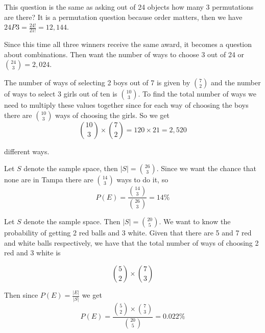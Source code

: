 \documentclass[11pt,largemargins]{homework}
\begin{document}
\maketitle

\question
\begin{alphaparts}
\questionpart
This question is the same as asking out of 24 objects how many 3 permutations are there? It is a permutation question because order matters, then we have $24P3 = \frac{24!}{21!} = 12,144$.

\questionpart
Since this time all three winners receive the same award, it becomes a question about combinations. Then want the number of ways to choose 3 out of 24 or ${24 \choose 3} = 2,024$.
\end{alphaparts}

\question
The number of ways of selecting 2 boys out of 7 is given by ${7 \choose 2}$ and the number of ways to select 3 girls out of ten is ${10 \choose 3}$. To find the total number of ways we need to multiply these values together since for each way of choosing the boys there are ${10 \choose 3}$ ways of choosing the girls. So we get 
\[{10 \choose 3} \times {7 \choose 2} = 120 \times 21 = 2,520 \] 

different ways. 

\question
Let $S$ denote the sample space, then $|S| = {26 \choose 3}$. Since we want the chance that none are in Tampa there are ${14 \choose 3}$ ways to do it, so 
\[P(E) = \frac{{14 \choose 3}}{{26 \choose 3}} = 14\%\]


\question
Let $S$ denote the sample space. Then $|S| = {20 \choose 5}$. We want to know the probability of getting 2 red balls and 3 white. Given that there are 5 and 7 red and white balls respectively, we have that the total number of ways of choosing 2 red and 3 white is 

\[ {5 \choose 2} \times {7 \choose 3} \] 

Then since $P(E) = \frac{|E|}{|S|}$ we get 
\[P(E) = \frac{{5 \choose 2} \times {7 \choose 3} }{ {20 \choose 5}} = 0.022\%\]
\end{document}
